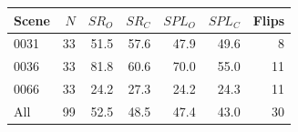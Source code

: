 \begin{tabular}{lrrrrrr}
\toprule
Scene & $N$ & $SR_O$ & $SR_C$ & $SPL_O$ & $SPL_C$ & Flips \\
\midrule
0031 & 33 & 51.5 & 57.6 & 47.9 & 49.6 & 8 \\
0036 & 33 & 81.8 & 60.6 & 70.0 & 55.0 & 11 \\
0066 & 33 & 24.2 & 27.3 & 24.2 & 24.3 & 11 \\
\midrule
All & 99 & 52.5 & 48.5 & 47.4 & 43.0 & 30 \\
\bottomrule
\end{tabular}
